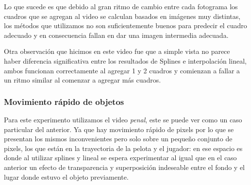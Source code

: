 Lo que sucede es que debido al gran ritmo de cambio entre cada fotograma los cuadros que se agregan al video se calculan basados en imágenes muy distintas, los métodos que utilizamos no son suficientemente buenos para predecir el cuadro adecuado y en consecuencia fallan en dar una imagen intermedia adecuada.

Otra observación que hicimos en este video fue que a simple vista no parece haber diferencia significativa entre los resultados de Splines e interpolación lineal, ambos funcionan correctamente al agregar 1 y 2 cuadros y comienzan a fallar a un ritmo similar al comenzar a agregar más cuadros. 

\subsubsection{Movimiento rápido de objetos}

Para este experimento utilizamos el video \textit{penal}, este se puede ver como un caso particular del anterior. Ya que hay movimiento rápido de pixels por lo que se presentan los mismos inconvenientes pero solo sobre un pequeño conjunto de pixels, los que están en la trayectoria de la pelota y el jugador: en ese espacio es donde al utilizar splines y lineal se espera experimentar al igual que en el caso anterior un efecto de transparencia y superposición indeseable entre el fondo y el lugar donde estuvo el objeto previamente.


